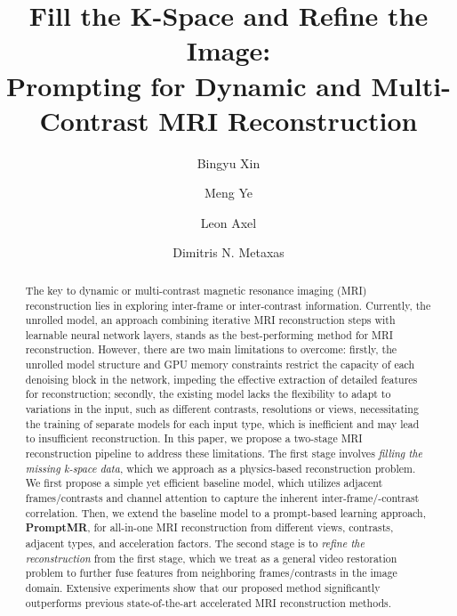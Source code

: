 \documentclass[runningheads]{llncs}
\begin{document}
\title{Fill the K-Space and Refine the Image:\\ Prompting for Dynamic and Multi-Contrast MRI Reconstruction}
\author{Bingyu Xin \and
Meng Ye \and
Leon Axel \and
Dimitris N. Metaxas 
}

\maketitle              

\begin{abstract}
The key to dynamic or multi-contrast magnetic resonance imaging (MRI) reconstruction lies in exploring inter-frame or inter-contrast information. 
Currently, the unrolled model, an approach combining iterative MRI reconstruction steps with learnable neural network layers, stands as the best-performing method for MRI reconstruction. However, there are two main limitations to overcome: firstly, the unrolled model structure and GPU memory constraints restrict the capacity of each denoising block in the network, impeding the effective extraction of detailed features for reconstruction; 
secondly, the existing model lacks the flexibility to adapt to variations in the input, such as different contrasts, resolutions or views, necessitating the training of separate models for each input type, which is inefficient and may lead to insufficient reconstruction.
In this paper, we propose a two-stage MRI reconstruction pipeline to address these limitations. The first stage involves \emph{filling the missing k-space data}, which we approach as a physics-based reconstruction problem. 
We first propose a simple yet efficient baseline model, which utilizes adjacent frames/contrasts and channel attention to capture the inherent inter-frame/-contrast correlation.
Then, we extend the baseline model to a prompt-based learning approach, \textbf{PromptMR}, for all-in-one MRI reconstruction from different views, contrasts, adjacent types, and acceleration factors.
The second stage is to \emph{refine the reconstruction} from the first stage, which we treat as a general video restoration problem to further fuse features from neighboring frames/contrasts in the image domain.
Extensive experiments show that our proposed method significantly outperforms previous state-of-the-art accelerated MRI reconstruction methods.


\end{abstract}
\end{document}
